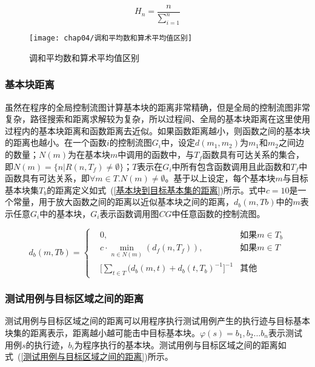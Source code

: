 \begin{equation}\label{调和平均数}
H_{n} = \frac{n}{\sum_{i=1}^{n}}
\end{equation}

\begin{figure}[htb]
\begin{center}
\texttt{[image: chap04/调和平均数和算术平均值区别]}
\end{center}
\caption{调和平均数和算术平均值区别}
\label{调和平均数和算术平均值区别}
\end{figure}

\subsubsection{基本块距离}

虽然在程序的全局控制流图计算基本块的距离非常精确，但是全局的控制流图非常复杂，路径搜索和距离求解较为复杂，所以过程间、全局的基本块距离在这里使用过程内的基本块距离和函数距离去近似。如果函数距离越小，则函数之间的基本块的距离也越小。在一个函数$i$的控制流图$G_i$中，设定$d(m_1,m_2)$为$m_1$和$m_2$之间边的数量；$N(m)$为在基本块$m$中调用的函数中，与$T_f$函数具有可达关系的集合，即$N(m) = \{n | R(n, T_f) \neq \emptyset \}$；$T$表示在$G_i$中所有包含函数调用且此函数和$T_f$中函数具有可达关系，即$\forall m \in T.N(m) \neq \emptyset$。基于以上设定，每个基本块$m$与目标基本块集$T_b$的距离定义如式~(\ref{基本块到目标基本集的距离})所示。式中$c=10$是一个常量，用于放大函数之间的距离以近似基本块之间的距离，$d_{b}(m,Tb)$中的$m$表示任意$G_i$中的基本块，$G_i$表示函数调用图$CG$中任意函数的控制流图。

\begin{equation}\label{基本块到目标基本集的距离}
d_{b}(m,Tb)=\left\{
\begin{aligned}
& 0, & \text{如果} m \in T_{b} \\
& c \cdot \min\limits_{n \in N(m)}(d_{f}(n,T_{f})), & \text{如果} m \in T \\
& \lbrack \sum_{t \in T}(d_{b}(m,t) + d_{b}(t,T_{b}) ^{-1}\rbrack^{-1} & \text{其他}
\end{aligned}
\right.
\end{equation} 

\subsubsection{测试用例与目标区域之间的距离}

测试用例与目标区域之间的距离可以用程序执行测试用例产生的执行迹与目标基本块集的距离表示，距离越小越可能击中目标基本块。$\varphi(s)={b_1,b_2...b_n}$表示测试用例$s$的执行迹，$b_i$为程序执行的基本块。测试用例与目标区域之间的距离如式~(\ref{测试用例与目标区域之间的距离})所示。

